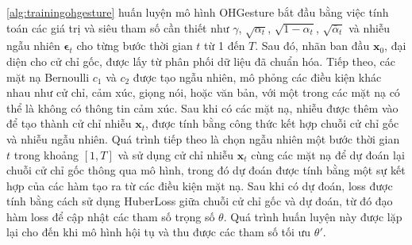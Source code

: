 \autoref{alg:trainingohgesture} huấn luyện mô hình OHGesture bắt đầu bằng việc tính toán các giá trị và siêu tham số cần thiết như $\gamma$, $\sqrt{\alpha_t}$, $\sqrt{1 - \alpha_t}$, $\sqrt{\bar{\alpha}_t}$ và nhiễu ngẫu nhiên $\boldsymbol{\epsilon}_t$ cho từng bước thời gian $t$ từ 1 đến $T$. Sau đó, nhãn ban đầu $\mathbf{x}_0$, đại diện cho cử chỉ gốc, được lấy từ phân phối dữ liệu đã chuẩn hóa. Tiếp theo, các mặt nạ Bernoulli $c_1$ và $c_2$ được tạo ngẫu nhiên, mô phỏng các điều kiện khác nhau như cử chỉ, cảm xúc, giọng nói, hoặc văn bản, với một trong các mặt nạ có thể là không có thông tin cảm xúc. Sau khi có các mặt nạ, nhiễu được thêm vào để tạo thành cử chỉ nhiễu $\mathbf{x}_t$, được tính bằng công thức kết hợp chuỗi cử chỉ gốc và nhiễu ngẫu nhiên. Quá trình tiếp theo là chọn ngẫu nhiên một bước thời gian $t$ trong khoảng $[1, T]$ và sử dụng cử chỉ nhiễu $\mathbf{x}_t$ cùng các mặt nạ để dự đoán lại chuỗi cử chỉ gốc thông qua mô hình, trong đó dự đoán được tính bằng một sự kết hợp của các hàm tạo ra từ các điều kiện mặt nạ. Sau khi có dự đoán, loss được tính bằng cách sử dụng HuberLoss giữa chuỗi cử chỉ gốc và dự đoán, từ đó đạo hàm loss để cập nhật các tham số trọng số $\theta$. Quá trình huấn luyện này được lặp lại cho đến khi mô hình hội tụ và thu được các tham số tối ưu $\theta'$.


%
%
%	


